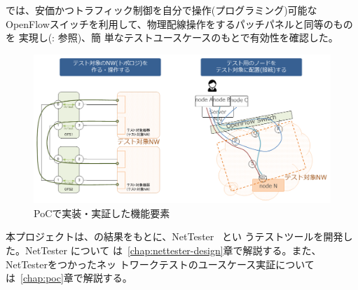 \lopjc では、安価かつトラフィック制御を自分で操作(プログラミング)可能な
OpenFlowスイッチを利用して、物理配線操作をするパッチパネルと同等のものを
実現し(: 参照)、簡
単なテストユースケースのもとで有効性を確認した。

\begin{figure}[h]
 \centering
 \includegraphics[scale=0.5]{img/poc-l1patchpj.png}
 \caption{\lopj PoCで実装・実証した機能要素}
 \label{fig:poc-l1patchpj}
\end{figure}



 本プロジェクトは、\lopj の結果をもとに、NetTester~\cite{nettester} とい
 うテストツールを開発した。NetTester について
 は~\ref{chap:nettester-design}章で解説する。また、NetTesterをつかったネッ
 トワークテストのユースケース実証については~\ref{chap:poc}章で解説する。


